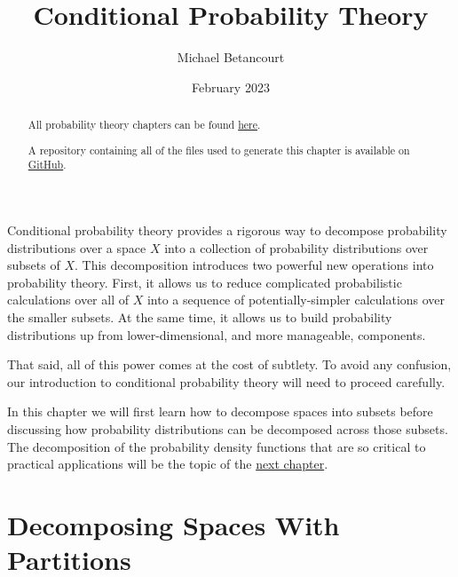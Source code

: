 \documentclass[
  letterpaper,
  DIV=11,
  numbers=noendperiod]{scrartcl}
\title{Conditional Probability Theory}
\author{Michael Betancourt}
\date{February 2023}
\renewcommand*\contentsname{Table of contents}
\newcommand\contentsname{Table of contents}
\begin{document}
\maketitle
\begin{abstract}
All probability theory chapters can be found
\href{http://www.symplectomorphic.com/writing/\#part1}{here}.

A repository containing all of the files used to generate this chapter
is available on
\href{https://github.com/betanalpha/quarto_chapters/tree/main/8_conditional_probability_theory}{GitHub}.
\end{abstract}

\renewcommand*\contentsname{Table of contents}
{
\hypersetup{linkcolor=}
\setcounter{tocdepth}{3}
\tableofcontents
}
\newcommand{\I}[2]{\mathbb{I}_{#1} \! \left[ #2 \right]}

\newcommand{\E}[2]{\mathbb{E}_{#1} \! \left[ #2 \right]}

\newcommand{\rnd}[2]{\frac{ \mathrm{d} #1}{ \mathrm{d} #2 }}

Conditional probability theory provides a rigorous way to decompose
probability distributions over a space \(X\) into a collection of
probability distributions over subsets of \(X\). This decomposition
introduces two powerful new operations into probability theory. First,
it allows us to reduce complicated probabilistic calculations over all
of \(X\) into a sequence of potentially-simpler calculations over the
smaller subsets. At the same time, it allows us to build probability
distributions up from lower-dimensional, and more manageable,
components.

That said, all of this power comes at the cost of subtlety. To avoid any
confusion, our introduction to conditional probability theory will need
to proceed carefully.

In this chapter we will first learn how to decompose spaces into subsets
before discussing how probability distributions can be decomposed across
those subsets. The decomposition of the probability density functions
that are so critical to practical applications will be the topic of the
\href{http://www.symplectomorphic.com/assets/chapters_html/conditional_probability_density_functions.html}{next
chapter}.

\section{Decomposing Spaces With Partitions}\label{sec:partitions}
\end{document}
